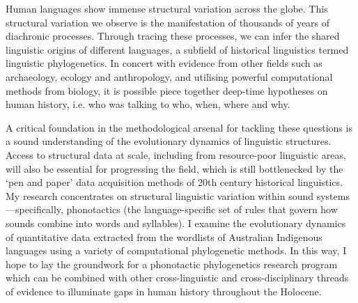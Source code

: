 

%

%




Human languages show immense structural variation across the globe. This structural variation we observe is the manifestation of thousands of years of diachronic processes. Through tracing these processes, we can infer the shared linguistic origins of different languages, a subfield of historical linguistics termed linguistic phylogenetics. In concert with evidence from other fields such as archaeology, ecology and anthropology, and utilising powerful computational methods from biology, it is possible piece together deep-time hypotheses on human history, i.e. who was talking to who, when, where and why.

A critical foundation in the methodological arsenal for tackling these questions is a sound understanding of the evolutionary dynamics of linguistic structures. Access to structural data at scale, including from resource-poor linguistic areas, will also be essential for progressing the field, which is still bottlenecked by the ‘pen and paper’ data acquisition methods of 20th century historical linguistics. My research concentrates on structural linguistic variation within sound systems—specifically, phonotactics (the language-specific set of rules that govern how sounds combine into words and syllables). I examine the evolutionary dynamics of quantitative data extracted from the wordlists of Australian Indigenous languages using a variety of computational phylogenetic methods. In this way, I hope to lay the groundwork for a phonotactic phylogenetics research program which can be combined with other cross-linguistic and cross-disciplinary threads of evidence to illuminate gaps in human history throughout the Holocene.

